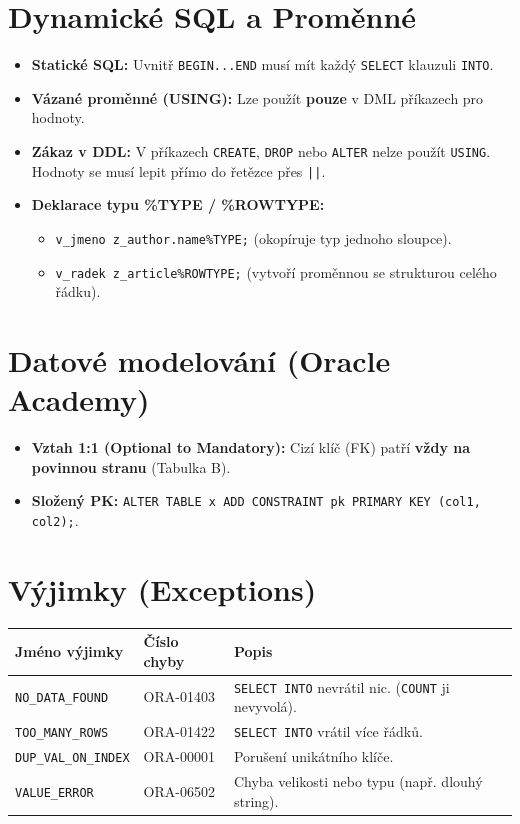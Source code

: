\documentclass[12pt,a4paper]{article}
\begin{document}
\section{Dynamické SQL a Proměnné}
\begin{itemize}
    \item \textbf{Statické SQL:} Uvnitř \texttt{BEGIN...END} musí mít každý \texttt{SELECT} klauzuli \texttt{INTO}.
    \item \textbf{Vázané proměnné (USING):} Lze použít \textbf{pouze} v DML příkazech pro hodnoty.
    \item \textbf{Zákaz v DDL:} V příkazech \texttt{CREATE}, \texttt{DROP} nebo \texttt{ALTER} nelze použít \texttt{USING}. Hodnoty se musí lepit přímo do řetězce přes \texttt{||}.
    \item \textbf{Deklarace typu \%TYPE / \%ROWTYPE:}
    \begin{itemize}
        \item \texttt{v\_jmeno z\_author.name\%TYPE;} (okopíruje typ jednoho sloupce).
        \item \texttt{v\_radek z\_article\%ROWTYPE;} (vytvoří proměnnou se strukturou celého řádku).
    \end{itemize}
\end{itemize}

\section{Datové modelování (Oracle Academy)}
\begin{itemize}
    \item \textbf{Vztah 1:1 (Optional to Mandatory):} Cizí klíč (FK) patří \textbf{vždy na povinnou stranu} (Tabulka B).
    \item \textbf{Složený PK:} \texttt{ALTER TABLE x ADD CONSTRAINT pk PRIMARY KEY (col1, col2);}.
\end{itemize}

\newpage
\section{Výjimky (Exceptions)}

\begin{table}[h]
\centering
\begin{tabularx}{\textwidth}{|l|l|X|}
\hline
\textbf{Jméno výjimky} & \textbf{Číslo chyby} & \textbf{Popis} \\ \hline
\texttt{NO\_DATA\_FOUND} & ORA-01403 & \texttt{SELECT INTO} nevrátil nic. (\texttt{COUNT} ji nevyvolá). \\ \hline
\texttt{TOO\_MANY\_ROWS} & ORA-01422 & \texttt{SELECT INTO} vrátil více řádků. \\ \hline
\texttt{DUP\_VAL\_ON\_INDEX} & ORA-00001 & Porušení unikátního klíče. \\ \hline
\texttt{VALUE\_ERROR} & ORA-06502 & Chyba velikosti nebo typu (např. dlouhý string). \\ \hline
\end{tabularx}
\end{table}
\end{document}
